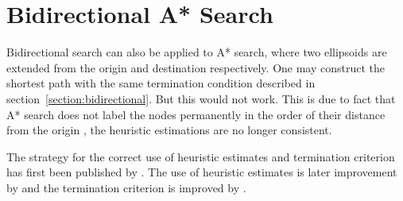 \section{Bidirectional A* Search}
Bidirectional search can also be applied to A* search,
where two ellipsoids are extended from the origin and destination respectively.
One may construct the shortest path with the same termination condition described in section~\ref{section:bidirectional}.
But this would not work.
This is due to fact that A* search does not label the nodes permanently in the order of their distance from the origin \citep{Klunder},
the heuristic estimations are no longer consistent.

The strategy for the correct use of heuristic estimates and termination criterion has first been published by \citet{Pohl}. The use of heuristic estimates is later improvement by \citet{Ikeda} and the termination criterion is improved by \citet{GoldbergEPP}.

